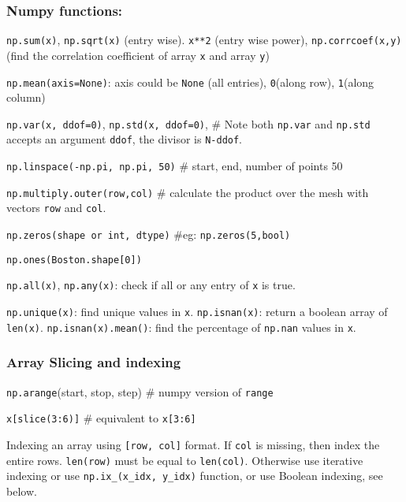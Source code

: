 \documentclass[
  letterpaper,
  DIV=11,
  numbers=noendperiod]{scrreprt}
\begin{document}
\subsubsection{Numpy functions:}\label{numpy-functions}

\texttt{np.sum(x)}, \texttt{np.sqrt(x)} (entry wise). \texttt{x**2}
(entry wise power), \texttt{np.corrcoef(x,y)} (find the correlation
coefficient of array \texttt{x} and array \texttt{y})

\texttt{np.mean(axis=None)}: axis could be \texttt{None} (all entries),
\texttt{0}(along row), \texttt{1}(along column)

\texttt{np.var(x,\ ddof=0)}, \texttt{np.std(x,\ ddof=0)}, \# Note both
\texttt{np.var} and \texttt{np.std} accepts an argument \texttt{ddof},
the divisor is \texttt{N-ddof}.

\texttt{np.linspace(-np.pi,\ np.pi,\ 50)} \# start, end, number of
points 50

\texttt{np.multiply.outer(row,col)} \# calculate the product over the
mesh with vectors \texttt{row} and \texttt{col}.

\texttt{np.zeros(shape\ or\ int,\ dtype)} \#eg:
\texttt{np.zeros(5,bool)}

\texttt{np.ones(Boston.shape{[}0{]})}

\texttt{np.all(x)}, \texttt{np.any(x)}: check if all or any entry of
\texttt{x} is true.

\texttt{np.unique(x)}: find unique values in \texttt{x}.
\texttt{np.isnan(x)}: return a boolean array of \texttt{len(x)}.
\texttt{np.isnan(x).mean()}: find the percentage of \texttt{np.nan}
values in \texttt{x}.

\subsubsection{Array Slicing and
indexing}\label{array-slicing-and-indexing}

\texttt{np.arange}(start, stop, step) \# numpy version of \texttt{range}

\texttt{x{[}slice(3:6){]}} \# equivalent to \texttt{x{[}3:6{]}}

Indexing an array using \texttt{{[}row,\ col{]}} format. If \texttt{col}
is missing, then index the entire rows. \texttt{len(row)} must be equal
to \texttt{len(col)}. Otherwise use iterative indexing or use
\texttt{np.ix\_(x\_idx,\ y\_idx)} function, or use Boolean indexing, see
below.
\end{document}
